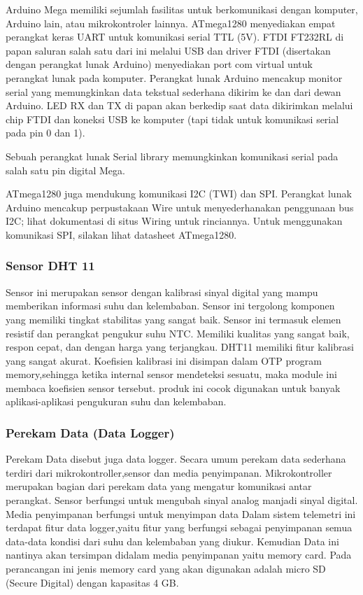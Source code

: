 
Arduino Mega memiliki sejumlah fasilitas untuk berkomunikasi dengan komputer, Arduino lain, atau mikrokontroler lainnya. ATmega1280 menyediakan empat perangkat keras UART untuk komunikasi serial TTL (5V). FTDI FT232RL di papan saluran salah satu dari ini melalui USB dan driver FTDI (disertakan dengan perangkat lunak Arduino) menyediakan port com virtual untuk perangkat lunak pada komputer. Perangkat lunak Arduino mencakup monitor serial yang memungkinkan data tekstual sederhana dikirim ke dan dari dewan Arduino. LED RX dan TX di papan akan berkedip saat data dikirimkan melalui chip FTDI dan koneksi USB ke komputer (tapi tidak untuk komunikasi serial pada pin 0 dan 1).

Sebuah perangkat lunak Serial library memungkinkan komunikasi serial pada salah satu pin digital Mega.

ATmega1280 juga mendukung komunikasi I2C (TWI) dan SPI. Perangkat lunak Arduino mencakup perpustakaan Wire untuk menyederhanakan penggunaan bus I2C; lihat dokumentasi di situs Wiring untuk rinciannya. Untuk menggunakan komunikasi SPI, silakan lihat datasheet ATmega1280.
\subsubsection{Sensor DHT 11}
Sensor ini merupakan sensor dengan kalibrasi sinyal digital yang mampu memberikan informasi suhu dan kelembaban. Sensor ini tergolong komponen yang memiliki tingkat stabilitas yang sangat baik. Sensor ini termasuk elemen resistif dan perangkat pengukur suhu NTC.
Memiliki kualitas yang sangat baik, respon cepat, dan dengan harga yang
terjangkau. DHT11 memiliki fitur kalibrasi yang sangat akurat. Koefisien kalibrasi ini disimpan dalam OTP program memory,sehingga ketika internal sensor mendeteksi sesuatu, maka module ini membaca koefisien sensor tersebut. produk ini cocok digunakan untuk banyak aplikasi-aplikasi pengukuran suhu dan kelembaban.

\subsubsection{Perekam Data (Data Logger)}
 Perekam Data disebut juga data logger. Secara umum perekam data sederhana terdiri dari mikrokontroller,sensor dan media penyimpanan.
Mikrokontroller merupakan bagian dari perekam data yang mengatur komunikasi antar perangkat. Sensor berfungsi untuk mengubah sinyal analog manjadi sinyal digital. Media penyimpanan berfungsi untuk menyimpan data Dalam sistem telemetri ini terdapat fitur data logger,yaitu fitur yang berfungsi sebagai penyimpanan semua data-data kondisi dari suhu dan kelembaban yang diukur. Kemudian Data ini nantinya akan
tersimpan didalam media penyimpanan yaitu memory card. Pada perancangan ini jenis memory card yang akan digunakan adalah micro SD 
(Secure Digital) dengan kapasitas 4 GB.

